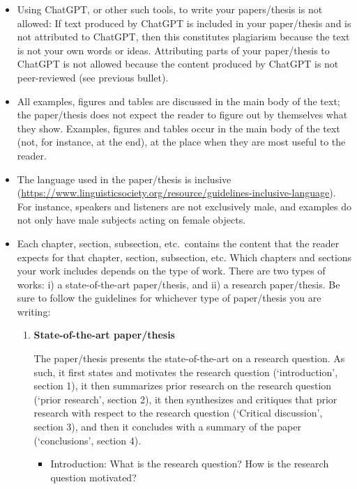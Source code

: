 \documentclass[11pt,fleqn,a4paper/thesis]{article}
\newcommand{\6}{\mbox{$[\hspace*{-.6mm}[$}}
\newcommand{\9}{\mbox{$]\hspace*{-.6mm}]$}}
\begin{document}
\begin{itemize}[itemsep=-1pt,leftmargin=2.5ex,topsep=-2pt]
\item Using ChatGPT, or other such tools, to write your papers/thesis is not allowed: If text produced by ChatGPT is included in your paper/thesis and is not attributed to ChatGPT,  then this constitutes plagiarism because the text is not your own words or ideas. Attributing parts of your paper/thesis to ChatGPT is not allowed because the content produced by ChatGPT is not peer-reviewed (see previous bullet).

\item All examples, figures and tables are discussed in the main body of the text; the paper/thesis does not expect the reader to figure out by themselves what they show. Examples, figures and tables occur in the main body of the text (not, for instance, at the end), at the place when they are most useful to the reader.

\item The language used in the paper/thesis is inclusive (\url{https://www.linguisticsociety.org/resource/guidelines-inclusive-language}). For instance, speakers and listeners are not exclusively male, and examples do not only have male subjects acting on female objects.

\item Each chapter, section, subsection, etc.\ contains the content that the reader expects for that chapter, section, subsection, etc. Which chapters and sections your work includes depends on the type of work.  There are two types of works: i) a state-of-the-art paper/thesis, and ii) a research paper/thesis. Be sure to follow the guidelines for whichever type of paper/thesis you are writing:

\begin{enumerate}

\item {\bf State-of-the-art paper/thesis}

The paper/thesis presents the state-of-the-art on a research question. As such, it first states and motivates the research question (`introduction', section 1), it then summarizes prior research on the research question (`prior research', section 2), it then synthesizes and critiques that prior research with respect to the research question (`Critical discussion', section 3), and then it concludes with a summary of the paper (`conclusions', section 4).

\begin{itemize}[leftmargin=2.5ex,topsep=-2pt]

\item Introduction: What is the research question? How is the research question motivated?


\end{itemize}
\end{enumerate}
\end{itemize}
\end{document}
